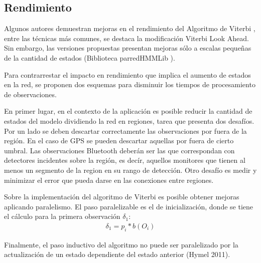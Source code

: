 \subsection{Rendimiento}
Algunos autores demuestran mejoras en el rendimiento del Algoritmo de Viterbi \cite{altafparallel,nielsen2011algorithms}, entre las técnicas más comunes, se destaca la modificación Viterbi Look Ahead. Sin embargo, las versiones propuestas presentan mejoras sólo a escalas pequeñas de la cantidad de estados (Biblioteca parredHMMLib \cite{nielsen2011algorithms}).

Para contrarrestar el impacto en rendimiento que implica el aumento de estados en la red, se proponen dos esquemas para disminuir los tiempos de procesamiento de observaciones.

En primer lugar, en el contexto de la aplicación es posible reducir la cantidad de estados del modelo dividiendo la red en regiones, tarea que presenta dos desafíos. Por un lado se deben descartar correctamente las observaciones por fuera de la región. En el caso de GPS se pueden descartar aquellas por fuera de cierto umbral. Las observaciones Bluetooth deberán ser las que correspondan con detectores incidentes sobre la región, es decír, aquellos monitores que tienen al menos un segmento de la region en su rango de detección. Otro desafío es medir y minimizar el error que pueda darse en las conexiones entre regiones.

Sobre la implementación del algoritmo de Viterbi es posible obtener mejoras aplicando paralelismo. El paso paralelizable es el de inicialización, donde se tiene el cálculo para la primera observación $\delta_1$:
\begin{align*}
    \delta_1 = p_i*b(O_i) 
\end{align*}

Finalmente, el paso inductivo del algoritmo no puede ser paralelizado por la actualización de un estado dependiente del estado anterior (Hymel 2011).